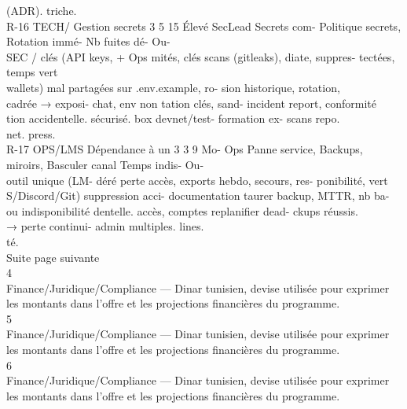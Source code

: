 \documentclass[12pt,landscape,a4paper]{article}
\begin{document}
(ADR).                                triche.\\
R-16       TECH/    Gestion secrets 3 5 15 Élevé SecLead Secrets   com- Politique secrets, Rotation immé- Nb fuites dé- Ou-\\
SEC      / clés (API keys,            + Ops mités,       clés scans (gitleaks), diate, suppres- tectées, temps vert\\
wallets)      mal                    partagées   sur .env.example, ro- sion historique, rotation,\\
cadrée → exposi-                     chat, env non tation clés, sand- incident report, conformité\\
tion accidentelle.                   sécurisé.       box devnet/test- formation     ex- scans repo.\\
net.              press.\\
R-17       OPS/LMS Dépendance à un 3 3 9       Mo- Ops        Panne     service, Backups, miroirs, Basculer canal Temps indis- Ou-\\
outil unique (LM-           déré           perte       accès, exports hebdo, secours,      res- ponibilité,   vert\\
S/Discord/Git)                             suppression acci- documentation taurer backup, MTTR, nb ba-\\
ou indisponibilité                         dentelle.          accès, comptes replanifier dead- ckups réussis.\\
→ perte continui-                                             admin multiples. lines.\\
té.\\
Suite page suivante\\
\vspace{0.5em}
\vspace{0.5em}
4\\
Finance/Juridique/Compliance — Dinar tunisien, devise utilisée pour exprimer les montants dans l’offre et les projections financières du programme.\\
5\\
Finance/Juridique/Compliance — Dinar tunisien, devise utilisée pour exprimer les montants dans l’offre et les projections financières du programme.\\
6\\
Finance/Juridique/Compliance — Dinar tunisien, devise utilisée pour exprimer les montants dans l’offre et les projections financières du programme.\\
\vspace{0.5em}
\end{document}
